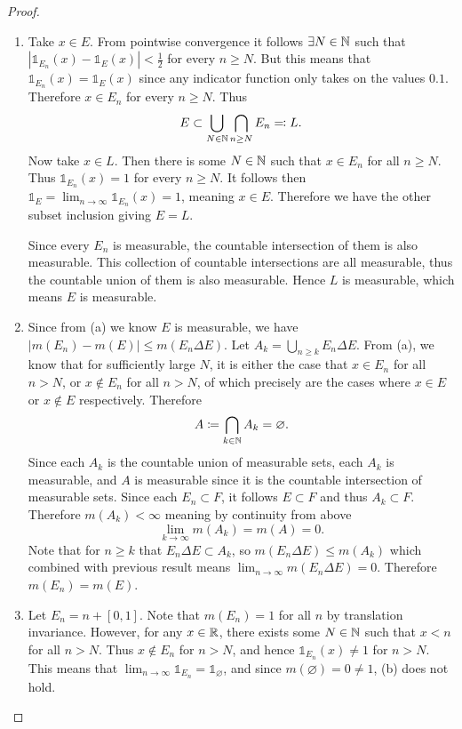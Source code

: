 \documentclass[hw_all.tex]{subfiles}
\begin{document}
\begin{proof}
    \begin{enumerate}
        \item
            Take $x \in E$. From pointwise convergence it follows $\exists N \in \mathbb{N}$ such that $|\mathds{1}_{E_n}(x) - \mathds{1}_{E}(x)| < \frac{1}{2}$ for every $n \geq N$. But this means that $\mathds{1}_{E_n}(x) = \mathds{1}_{E}(x)$ since any indicator function only takes on the values $\qty{0,1}$. Therefore $x \in E_n$ for every $n \geq N$. Thus
            \[
                E \subset \bigcup_{N \in \mathbb{N}} \bigcap_{n \geq N} E_n \eqcolon L
            .\]
            Now take $x \in L$. Then there is some $N \in \mathbb{N}$ such that $x \in E_n$ for all $n \geq N$. Thus $\mathds{1}_{E_n}(x) = 1$ for every $n \geq N$. It follows then $\mathds{1}_{E} = \lim_{n \to \infty} \mathds{1}_{E_n}(x) = 1$, meaning $x \in E$. Therefore we have the other subset inclusion giving $E = L$.

            Since every $E_n$ is measurable, the countable intersection of them is also measurable. This collection of countable intersections are all measurable, thus the countable union of them is also measurable. Hence $L$ is measurable, which means $E$ is measurable.

        \item 
            Since from (a) we know $E$ is measurable, we have $|m(E_n) - m(E)| \leq m(E_n \Delta E)$. Let $A_k = \bigcup_{n \geq k} E_n \Delta E$. From (a), we know that for sufficiently large $N$, it is either the case that $x \in E_n$ for all $n > N$, or $x \notin E_n$ for all $n > N$, of which precisely are the cases where $x \in E$ or $x \notin E$ respectively. Therefore
            \[
                A \coloneq \bigcap_{k \in \mathbb{N}} A_k = \varnothing
            .\]
            Since each $A_k$ is the countable union of measurable sets, each $A_k$ is measurable, and $A$ is measurable since it is the countable intersection of measurable sets. Since each $E_n \subset F$, it follows $E \subset F$ and thus $A_k \subset F$. Therefore $m(A_k) < \infty$ meaning by continuity from above
            \[
                \lim_{k \to \infty} m(A_k) = m(A) = 0
            .\]
            Note that for $n \geq k$ that $E_n \Delta E \subset A_k$, so $m(E_n \Delta E) \leq m(A_k)$ which combined with previous result means $\lim_{n \to \infty} m(E_n \Delta E) = 0$. Therefore $m(E_n) = m(E)$.
        \item 
            Let $E_n = n + [0,1]$. Note that $m(E_n) = 1$ for all $n$ by translation invariance. However, for any $x \in \mathbb{R}$, there exists some $N \in \mathbb{N}$ such that $x < n$ for all $n > N$. Thus $x \notin E_n$ for $n > N$, and hence $\mathds{1}_{E_n}(x) \neq 1$ for $n > N$. This means that $\lim_{n \to \infty} \mathds{1}_{E_n} = \mathds{1}_{\varnothing}$, and since $m(\varnothing) = 0 \neq 1$, (b) does not hold.
    \end{enumerate}
\end{proof}
\end{document}
